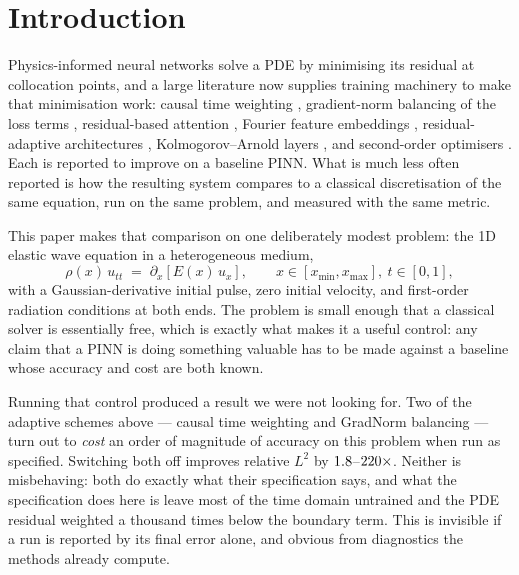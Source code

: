 
\section{Introduction}

Physics-informed neural networks \citep{raissi2019pinn} solve a PDE by
minimising its residual at collocation points, and a large literature now
supplies training machinery to make that minimisation work: causal time
weighting \citep{wang2022causal}, gradient-norm balancing of the loss terms
\citep{wang2021gradientflow,wang2023expert}, residual-based attention
\citep{anagnostopoulos2024rba}, Fourier feature embeddings
\citep{tancik2020fourier,wang2021fourier}, residual-adaptive architectures
\citep{wang2024piratenet}, Kolmogorov--Arnold layers
\citep{liu2024kan,bozorgasl2024wavkan,shukla2024pikan}, and second-order
optimisers \citep{vyas2024soap,wang2025soappinn}. Each is reported to improve
on a baseline PINN. What is much less often reported is how the resulting
system compares to a classical discretisation of the same equation, run on the
same problem, and measured with the same metric.

This paper makes that comparison on one deliberately modest problem: the 1D
elastic wave equation in a heterogeneous medium,
\begin{equation}
\rho(x)\, u_{tt} \;=\; \partial_x\!\left[E(x)\, u_x\right],
\qquad x \in [x_{\min}, x_{\max}],\ t \in [0,1],
\label{eq:wave}
\end{equation}
with a Gaussian-derivative initial pulse, zero initial velocity, and
first-order radiation conditions at both ends. The problem is small enough
that a classical solver is essentially free, which is exactly what makes it a
useful control: any claim that a PINN is doing something valuable has to be
made against a baseline whose accuracy and cost are both known.

Running that control produced a result we were not looking for. Two of the
adaptive schemes above --- causal time weighting and GradNorm balancing ---
turn out to \emph{cost} an order of magnitude of accuracy on this problem when
run as specified. Switching both off improves relative $L^2$ by
$1.8$--$220\times$. Neither is misbehaving: both do exactly
what their specification says, and what the specification does here is leave
most of the time domain untrained and the PDE residual weighted a thousand
times below the boundary term. This is invisible if a run is reported by its
final error alone, and obvious from diagnostics the methods already compute.

